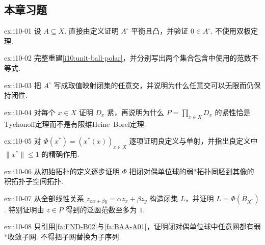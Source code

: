 \subsection{本章习题}\label{sec:i10-exercises}

\begin{FAExercise}[极集的基本性质]{ex:i10-01}
设 \(\displaystyle A\subseteq X\). 直接由定义证明 \(\displaystyle A^\circ\) 平衡且凸，并验证 \(\displaystyle0\in A^\circ\). 不使用双极定理.
\end{FAExercise}

\begin{FAExercise}[单位球极集]{ex:i10-02}
完整重建\autoref{i10:unit-ball-polar}，并分别写出两个集合包含中使用的范数不等式.
\end{FAExercise}

\begin{FAExercise}[极集的弱*闭性]{ex:i10-03}
把 \(\displaystyle A^\circ\) 写成取值映射闭集的任意交，并说明为什么任意交可以无限而仍保持闭性.
\end{FAExercise}

\begin{FAExercise}{ex:i10-04}
对每个 \(\displaystyle x\in X\) 证明 \(\displaystyle D_x\) 紧，再说明为什么 \(\displaystyle P=\prod_{x\in X}D_x\) 的紧性恰是Tychonoff定理而不是有限维Heine--Borel定理.
\end{FAExercise}

\begin{FAExercise}[乘积嵌入的良定义与单射]{ex:i10-05}
对 \(\displaystyle \Phi(x^*)=(x^*(x))_{x\in X}\) 逐项证明良定义与单射，并指出良定义中 \(\displaystyle \|x^*\|\leqslant1\) 的精确作用.
\end{FAExercise}

\begin{FAExercise}[弱*拓扑与积拓扑]{ex:i10-06}
从初始拓扑的定义逐步证明 \(\displaystyle \Phi\) 把闭对偶单位球的弱*拓扑同胚到其像的积拓扑子空间拓扑.
\end{FAExercise}

\begin{FAExercise}{ex:i10-07}
从全部线性关系 \(\displaystyle z_{\alpha x+\beta y}=\alpha z_x+\beta z_y\) 构造闭集 \(\displaystyle L\)，并证明 \(\displaystyle L=\Phi(\overline B_{X^*})\). 特别证明由 \(\displaystyle z\in P\) 得到的泛函范数至多为 \(\displaystyle1\).
\end{FAExercise}

\begin{FAExercise}{ex:i10-08}
只引用\autoref{fa:FND-B02}与\autoref{fa:BAA-A01}，证明闭对偶单位球中任意网都有弱*收敛子网. 不得把子网替换为子序列.
\end{FAExercise}

